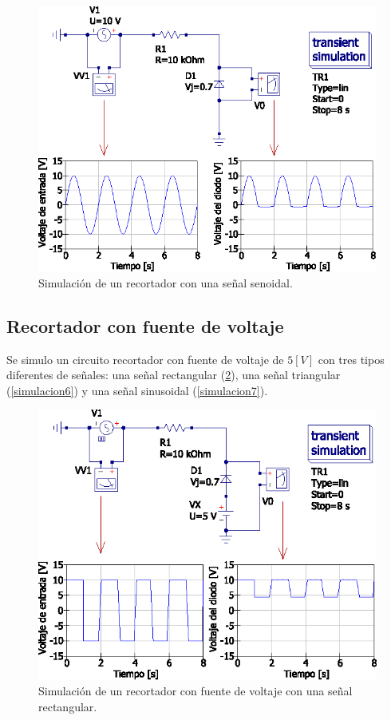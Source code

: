 \documentclass[letter,twoside,11pt]{article}
\begin{document}
{\begin{figure}[!h]
\centering
\includegraphics[scale=1.00]{simulacion/practica1.4.eps}
\caption{Simulación de un recortador con una señal senoidal.}
\label{simulacion4}
\end{figure}

\subsection{Recortador con fuente de voltaje}
Se simulo un circuito recortador con fuente de voltaje de $5[V]$  con tres tipos
diferentes de señales: una señal rectangular (\ref{simulacion5}), una señal
triangular (\ref{simulacion6}) y una señal sinusoidal (\ref{simulacion7}).

\begin{figure}[!h]
\centering
\includegraphics[scale=1.00]{simulacion/practica1.5.eps}
\caption{Simulación de un recortador con fuente de voltaje con una señal rectangular.}
\label{simulacion5}
\end{figure}

}
\end{document}
